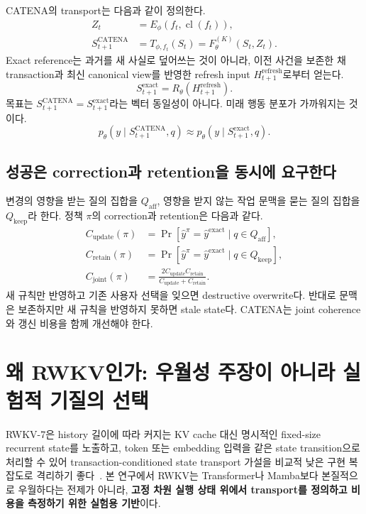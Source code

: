 \documentclass[10.5pt,a4paper]{article}
\begin{document}
CATENA의 transport는 다음과 같이 정의한다.
\begin{align}
Z_t &= E_\phi\!\left(f_t,\operatorname{cl}(f_t)\right),\\
S_{t+1}^{\mathrm{CATENA}} &= T_{\phi,f_t}(S_t)=F_\theta^{(K)}(S_t,Z_t).
\end{align}
Exact reference는 과거를 새 사실로 덮어쓰는 것이 아니라, 이전 사건을 보존한 채 transaction과 최신 canonical view를 반영한 refresh input $H_{t+1}^{\mathrm{refresh}}$로부터 얻는다.
\begin{equation}
S_{t+1}^{\mathrm{exact}}=R_\theta\!\left(H_{t+1}^{\mathrm{refresh}}\right).
\end{equation}
목표는 $S_{t+1}^{\mathrm{CATENA}}=S_{t+1}^{\mathrm{exact}}$라는 벡터 동일성이 아니다. 미래 행동 분포가 가까워지는 것이다.
\begin{equation}
p_\theta(y\mid S_{t+1}^{\mathrm{CATENA}},q)\approx p_\theta(y\mid S_{t+1}^{\mathrm{exact}},q).
\end{equation}

\subsection{성공은 correction과 retention을 동시에 요구한다}

변경의 영향을 받는 질의 집합을 $Q_{\mathrm{aff}}$, 영향을 받지 않는 작업 문맥을 묻는 질의 집합을 $Q_{\mathrm{keep}}$라 한다. 정책 $\pi$의 correction과 retention은 다음과 같다.
\begin{align}
C_{\mathrm{update}}(\pi)&=\Pr[\hat y^\pi=\hat y^{\mathrm{exact}}\mid q\in Q_{\mathrm{aff}}],\\
C_{\mathrm{retain}}(\pi)&=\Pr[\hat y^\pi=\hat y^{\mathrm{exact}}\mid q\in Q_{\mathrm{keep}}],\\
C_{\mathrm{joint}}(\pi)&=\frac{2C_{\mathrm{update}}C_{\mathrm{retain}}}{C_{\mathrm{update}}+C_{\mathrm{retain}}}.
\end{align}
새 규칙만 반영하고 기존 사용자 선택을 잊으면 destructive overwrite다. 반대로 문맥은 보존하지만 새 규칙을 반영하지 못하면 stale state다. CATENA는 joint coherence와 갱신 비용을 함께 개선해야 한다.

\section{왜 RWKV인가: 우월성 주장이 아니라 실험적 기질의 선택}

RWKV-7은 history 길이에 따라 커지는 KV cache 대신 명시적인 fixed-size recurrent state를 노출하고, token 또는 embedding 입력을 같은 state transition으로 처리할 수 있어 transaction-conditioned state transport 가설을 비교적 낮은 구현 복잡도로 격리하기 좋다~\citep{rwkv7}. 본 연구에서 RWKV는 Transformer나 Mamba보다 본질적으로 우월하다는 전제가 아니라, \textbf{고정 차원 실행 상태 위에서 transport를 정의하고 비용을 측정하기 위한 실험용 기반}이다.
\end{document}
